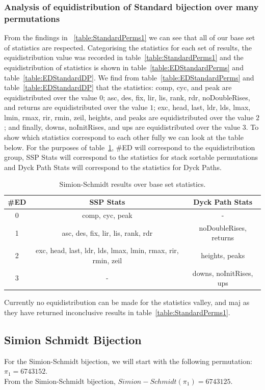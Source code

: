 \documentclass[12pt]{article}
\begin{document}
\subsubsection{Analysis of equidistribution of Standard bijection over many permutations}
From the findings in ~\ref{table:StandardPerms1} we can see that all of our base set of statistics are respected. Categorising the statistics for each set of results, the equidistribution value was recorded in table~\ref{table:StandardPerms1} and the equidistribution of statistics is shown in table~\ref{table:EDStandardPerms} and table~\ref{table:EDStandardDP}. We find from table~\ref{table:EDStandardPerms} and table~\ref{table:EDStandardDP} that the statistics: comp, cyc, and peak are equidistributed over the value $0$; asc, des, fix, lir, lis, rank, rdr, noDoubleRises, and returns are equidistributed over the value $1$; exc, head, last, ldr, lds, lmax, lmin, rmax, rir, rmin, zeil, heights, and peaks are equidistributed over the value $2$; and finally, downs, noInitRises, and ups are equidistributed over the value $3$. To show which statistics correspond to each other fully we can look at the table below. For the purposes of table~\ref{table:FinalEDStandard}, \#ED will correspond to the equidistribution group, SSP Stats will correspond to the statistics for stack sortable permutations and Dyck Path Stats will correspond to the statistics for Dyck Paths.
\begin{table}[H]
\caption{Simion-Schmidt results over base set statistics.}
\begin{tabular}{c | c | c}
\hline\hline
\#ED & SSP Stats & Dyck Path Stats\\ [0.5ex]
\hline
0 & comp, cyc, peak & - \\
\hline
1 & asc, des, fix, lir, lis, rank, rdr & noDoubleRises, returns \\
\hline
2 & exc, head, last, ldr, lds, lmax, lmin, rmax, rir, rmin, zeil & heights, peaks \\
\hline
3 & - & downs, noInitRises, ups\\
\hline
\end{tabular}
\label{table:FinalEDStandard}
\end{table}
Currently no equidistribution can be made for the statistics valley, and maj as they have returned inconclusive results in table~\ref{table:StandardPerms1}.

\subsection{Simion Schmidt Bijection}
For the Simion-Schmidt bijection, we will start with the following permutation: $\pi_1 = 6743152$.\\
From the Simion-Schmidt bijection, $Simion-Schmidt(\pi_1) = 6743125$.\\
\end{document}
